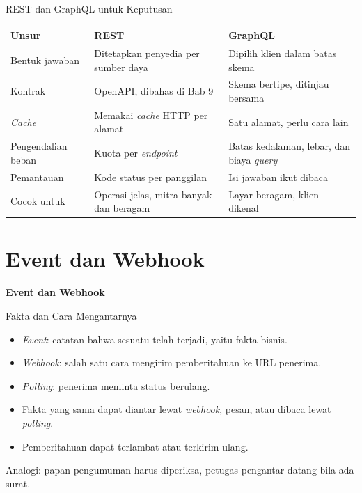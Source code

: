 \documentclass[aspectratio=169, table, 12pt]{beamer}
\begin{document}
\begin{frame}{{\Large REST dan GraphQL untuk Keputusan}}
  \footnotesize
  \begin{tabularx}{\textwidth}{>{\raggedright\arraybackslash}p{3.2cm}
      >{\raggedright\arraybackslash}X >{\raggedright\arraybackslash}X}
    \hline
    \textbf{Unsur} & \textbf{REST} & \textbf{GraphQL} \\ \hline
    Bentuk jawaban & Ditetapkan penyedia per sumber daya & Dipilih klien dalam batas skema \\ \hline
    Kontrak & OpenAPI, dibahas di Bab 9 & Skema bertipe, ditinjau bersama \\ \hline
    \textit{Cache} & Memakai \textit{cache} HTTP per alamat & Satu alamat, perlu cara lain \\ \hline
    Pengendalian beban & Kuota per \textit{endpoint} & Batas kedalaman, lebar, dan biaya \textit{query} \\ \hline
    Pemantauan & Kode status per panggilan & Isi jawaban ikut dibaca \\ \hline
    Cocok untuk & Operasi jelas, mitra banyak dan beragam & Layar beragam, klien dikenal \\ \hline
  \end{tabularx}
\end{frame}

\section{Event dan Webhook}

\begin{frame}{\hfill}
  \centering
  \Huge{\textbf{Event dan Webhook}}
\end{frame}

\begin{frame}{{\Large Fakta dan Cara Mengantarnya}}
  \vspace{10pt}
  \begin{itemize}
    \item \textit{Event}: catatan bahwa sesuatu telah terjadi, yaitu fakta bisnis.
    \item \textit{Webhook}: salah satu cara mengirim pemberitahuan ke URL penerima.
    \item \textit{Polling}: penerima meminta status berulang.
    \item Fakta yang sama dapat diantar lewat \textit{webhook}, pesan, atau dibaca lewat \textit{polling}.
    \item Pemberitahuan dapat terlambat atau terkirim ulang.
  \end{itemize}
  \vspace{6pt}
  {\small Analogi: papan pengumuman harus diperiksa, petugas pengantar datang bila ada surat.}
\end{frame}
\end{document}

